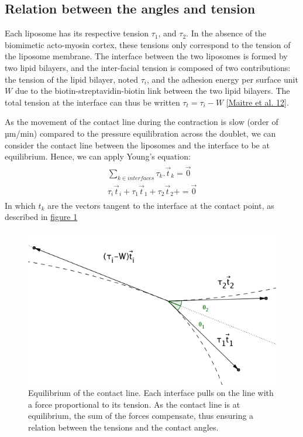 \documentclass[A4paperpaper,11pt,english]{sphinxmanual}
\begin{document}
\subsection{Relation between the angles and tension}
\label{parts/part4:relation-between-the-angles-and-tension}
Each liposome has its respective tension \(\tau_1\), and \(\tau_2\).  In the absence
of the biomimetic acto-myosin cortex, these tensions only correspond to the
tension of the liposome membrane. The interface between the two liposomes is
formed by two lipid bilayers, and the inter-facial tension is composed of two contributions:
the tension of the lipid bilayer, noted \(\tau_i\), and the
adhesion energy per surface unit \(W\) due to the biotin-streptavidin-biotin link
between the two lipid bilayers. The total tension at the interface can thus be
written \(\tau_t = \tau_i -W\) {\hyperref[parts/part4:maitre2012]{{[}Maitre et al. 12{]}}}.

As the movement of the contact line during the contraction is slow (order of
µm/min) compared to the pressure equilibration across the doublet, we can consider
the contact line between the liposomes and the interface to be at equilibrium.
Hence, we can apply Young's equation:
\label{parts/part4:equation-eqa401}\begin{gather}
\begin{split}\sum_{k \in interfaces} \tau_k. \vec t_k  = \vec 0 \\
\tau_i \vec t_i + \tau_1 \vec t_1 + \tau_2 \vec t_2 + = \vec 0\end{split}\label{parts/part4-eqa401}
\end{gather}
In which \(t_k\) are the vectors tangent to the interface at the contact point, as described in \hyperref[parts/part4:fig-yd]{figure  \ref*{parts/part4:fig-yd}}
\begin{figure}[htbp]
\centering
\capstart

\includegraphics[width=0.600\linewidth]{yd.png}
\caption{Equilibrium of the contact line. Each interface pulls on the line with a
force proportional to its tension. As the contact line is at equilibrium,
the sum of the forces compensate, thus ensuring  a relation between the tensions and the contact angles.}\label{parts/part4:fig-yd}\end{figure}
\end{document}
